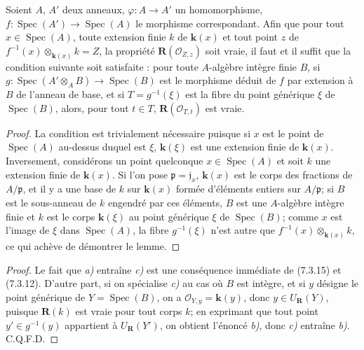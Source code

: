 \begin{lemma}[7.3.16.2]
\label{IV.2.s7.3.16.2-fr}
Soient $A$, $A'$ deux anneaux, $\varphi:A\to A'$ un homomorphisme,
$f:\operatorname{Spec}(A')\to\operatorname{Spec}(A)$ le morphisme
correspondant. Afin que pour tout $x\in\operatorname{Spec}(A)$, toute
extension finie $k$ de $\boldsymbol{k}(x)$ et tout point $z$ de
$f^{-1}(x)\otimes_{\mathbf{k}(x)}k=Z$, la propriété
$\boldsymbol R(\mathscr O_{Z,z})$ soit vraie, il faut et il suffit que la
condition suivante soit satisfaite : pour toute $A$-algèbre intègre finie
$B$, si
$g:\operatorname{Spec}(A'\otimes_A B)\to\operatorname{Spec}(B)$ est le
morphisme déduit de $f$ par extension à $B$ de l'anneau de base, et si
$T=g^{-1}(\xi)$ est la fibre du point générique $\xi$ de
$\operatorname{Spec}(B)$, alors, pour tout $t\in T$,
$\boldsymbol R(\mathscr O_{T,t})$ est vraie.
\end{lemma}

\begin{proof}
La condition est trivialement nécessaire puisque si $x$ est le point de
$\operatorname{Spec}(A)$ au-dessus duquel est $\xi$, $\boldsymbol{k}(\xi)$ est une
extension finie de $\boldsymbol{k}(x)$. Inversement, considérons un point quelconque
$x\in\operatorname{Spec}(A)$ et soit $k$ une extension finie de $\boldsymbol{k}(x)$.
Si l'on pose $\mathfrak p=\mathfrak j_x$, $\boldsymbol{k}(x)$ est le corps des
fractions de $A/\mathfrak p$, et il y a une base de $k$ sur $\boldsymbol{k}(x)$ formée
d'éléments entiers sur $A/\mathfrak p$; si $B$ est le sous-anneau de $k$
engendré par ces éléments, $B$ est une $A$-algèbre intègre finie et $k$
est le corps $\boldsymbol{k}(\xi)$ au point générique $\xi$ de
$\operatorname{Spec}(B)$; comme $x$ est l'image de $\xi$ dans
$\operatorname{Spec}(A)$, la fibre $g^{-1}(\xi)$ n'est autre que
$f^{-1}(x)\otimes_{\mathbf{k}(x)}k$, ce qui achève de démontrer le lemme.
\end{proof}

\begin{proof}
Le fait que \emph{a)} entraîne \emph{c)} est une conséquence immédiate de (7.3.15) et
(7.3.12). D'autre part, si on spécialise \emph{c)} au cas où $B$ est intègre, et
si $y$ désigne le point générique de $Y=\operatorname{Spec}(B)$, on a
$\mathscr O_{Y,y}=\boldsymbol{k}(y)$, donc $y\in U_{\mathbf{R}}(Y)$, puisque
$\boldsymbol R(k)$ est vraie pour tout corps $k$; en exprimant que tout
point $y'\in g^{-1}(y)$ appartient à $U_{\mathbf{R}}(Y')$, on obtient
l'énoncé \emph{b)}, donc \emph{c)} entraîne \emph{b)}. C.Q.F.D.
\end{proof}

